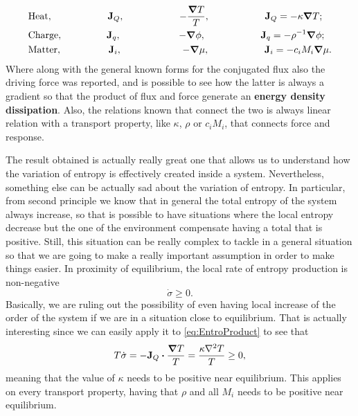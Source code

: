 \begin{align}
    &\text{Heat}, \hspace{2cm} \vb{J}_Q, \hspace{2cm} -\frac{\grad T}{T}, \hspace{2cm} \vb{J}_Q = -\kappa \grad T;\\
    &\text{Charge}, \hspace{1.6cm} \vb{J}_q, \hspace{2.1cm} -\grad \phi, \hspace{2cm} \vb{J}_q = -\rho^{-1} \grad \phi;\\
    &\text{Matter}, \hspace{1.7cm} \vb{J}_i, \hspace{2.2cm} -\grad \mu, \hspace{2cm} \vb{J}_i = -c_i M_i \grad \mu.
\end{align}
Where along with the general known forms for the conjugated flux also the driving force was reported, and is possible to see how the latter is always a gradient so that the product of flux and force generate an \textbf{energy density dissipation}. Also, the relations known that connect the two is always linear relation with a transport property, like $\kappa$, $\rho$ or $c_i M_i$, that connects force and response.

The result obtained is actually really great one that allows us to understand how the variation of entropy is effectively created inside a system. Nevertheless, something else can be actually sad about the variation of entropy. In particular, from second principle we know that in general the total entropy of the system always increase, so that is possible to have situations where the local entropy decrease but the one of the environment compensate having a total that is positive. Still, this situation can be really complex to tackle in a general situation so that we are going to make a really important assumption in order to make things easier.
{
    In proximity of equilibrium, the local rate of entropy production is non-negative
    \begin{equation}
        \dot{\sigma} \ge 0.
    \end{equation}
}
\noindent
Basically, we are ruling out the possibility of even having local increase of the order of the system if we are in a situation close to equilibrium. That is actually interesting since we can easily apply it to \eqref{eq:EntroProduct} to see that
\begin{equation}
    T\dot{\sigma} = -\vb{J}_Q\vdot\frac{\grad T}{T} = \frac{\kappa \laplacian T}{T} \ge 0,
\end{equation}
meaning that the value of $\kappa$ needs to be positive near equilibrium. This applies on every transport property, having that $\rho$ and all $M_i$ needs to be positive near equilibrium.

